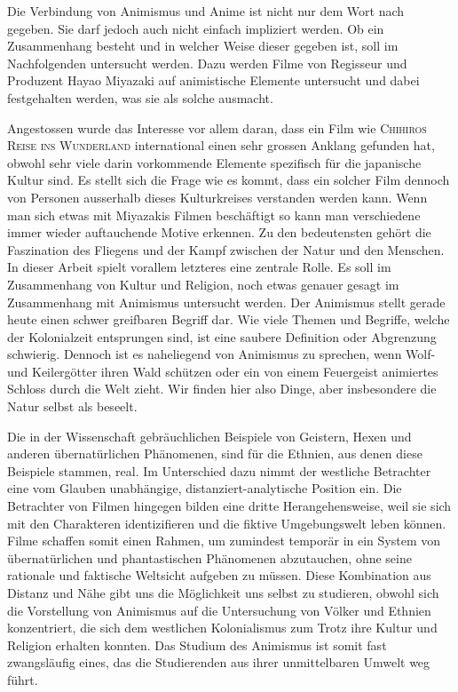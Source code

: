 
Die Verbindung von Animismus und Anime ist nicht nur dem Wort nach gegeben. Sie darf jedoch auch nicht einfach impliziert werden. Ob ein Zusammenhang besteht und in welcher Weise dieser gegeben ist, soll im Nachfolgenden untersucht werden. Dazu werden Filme von Regisseur und Produzent Hayao Miyazaki auf animistische Elemente untersucht und dabei festgehalten werden, was sie als solche ausmacht.

Angestossen wurde das Interesse vor allem daran, dass ein Film wie \textsc{Chihiros Reise ins Wunderland} international einen sehr grossen Anklang gefunden hat, obwohl sehr viele darin vorkommende Elemente spezifisch für die japanische Kultur sind. Es stellt sich die Frage wie es kommt, dass ein solcher Film dennoch von Personen ausserhalb dieses Kulturkreises verstanden werden kann. Wenn man sich etwas mit Miyazakis Filmen beschäftigt so kann man verschiedene immer wieder auftauchende Motive erkennen. Zu den bedeutensten gehört die Faszination des Fliegens und der Kampf zwischen der Natur und den Menschen. In dieser Arbeit spielt vorallem letzteres eine zentrale Rolle. Es soll im Zusammenhang von Kultur und Religion, noch etwas genauer gesagt im Zusammenhang mit Animismus untersucht werden. Der Animismus stellt gerade heute einen schwer greifbaren Begriff dar. Wie viele Themen und Begriffe, welche der Kolonialzeit entsprungen sind, ist eine saubere Definition oder Abgrenzung schwierig. Dennoch ist es naheliegend von Animismus zu sprechen, wenn Wolf- und Keilergötter ihren Wald schützen oder ein von einem Feuergeist animiertes Schloss durch die Welt zieht. Wir finden hier also Dinge, aber insbesondere die Natur selbst als beseelt. 

Die in der Wissenschaft gebräuchlichen Beispiele von Geistern, Hexen und anderen übernatürlichen Phänomenen, sind für die Ethnien, aus denen diese Beispiele stammen, real. Im Unterschied dazu nimmt der westliche Betrachter eine vom Glauben unabhängige, distanziert-analytische Position ein. Die Betrachter von Filmen hingegen bilden eine dritte Herangehensweise, weil sie sich mit den Charakteren identizifieren und die fiktive Umgebungswelt leben können. Filme schaffen somit einen Rahmen, um zumindest temporär in ein System von übernatürlichen und phantastischen Phänomenen abzutauchen, ohne seine rationale und faktische Weltsicht aufgeben zu müssen. Diese Kombination aus Distanz und Nähe gibt uns die Möglichkeit uns selbst zu studieren, obwohl sich die Vorstellung von Animismus auf die Untersuchung von Völker und Ethnien konzentriert, die sich dem westlichen Kolonialismus zum Trotz ihre Kultur und Religion erhalten konnten. Das Studium des Animismus ist somit fast zwangsläufig eines, das die Studierenden aus ihrer unmittelbaren Umwelt weg führt. 

